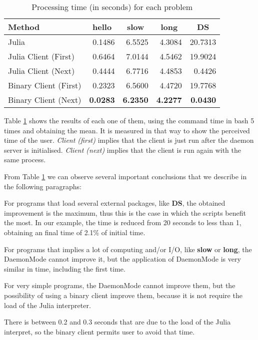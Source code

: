 \documentclass{juliacon}
\begin{document}
\begin{table}[htp]
  \centering
  \begin{tabular}{l*{4}{r}}
    \toprule
    Method & \multicolumn{1}{c}{\textbf{hello}} & \multicolumn{1}{c}{\textbf{slow}} & \multicolumn{1}{c}{\textbf{long}} & \multicolumn{1}{c}{\textbf{DS}}\\
    \midrule
    Julia & 0.1486 & 6.5525 &  4.3084 & 20.7313\\
    Julia Client (First) & 0.6464 & 7.0144 & 4.5462 & 19.9024\\
    Julia Client (Next) & 0.4444 & 6.7716 & 4.4853  & 0.4426\\
    Binary Client (First) & 0.2323 & 6.5600 & 4.4720 & 19.7768\\
    Binary Client (Next) & \textbf{0.0283} & \textbf{6.2350} & \textbf{4.2277} & \textbf{0.0430}\\
    \bottomrule
  \end{tabular}
  \caption{Processing time (in seconds) for each problem}
  \label{tab:times}
\end{table}

Table \ref{tab:times} shows the results of each one of them, using the command
time in bash 5 times and obtaining the mean. It is measured in that way to show
the perceived time of the user. \textit{Client (first)} implies that the client is just
run after the daemon server is initialised. \textit{Client (next)} implies that
the client is run again with the same process.

From Table \ref{tab:times} we can observe several important conclusions that we
describe in the following paragraphs:

For programs that load several external packages, like \textbf{DS}, the obtained
improvement is the maximum, thus this is the case in which the scripts benefit
the most. In our example, the time is reduced from 20 seconds to less than 1,
obtaining an final time of 2.1\% of initial time.
  
For programs that implies a lot of computing and/or I/O, like \textbf{slow} or
\textbf{long}, the DaemonMode cannot improve it, but the application of
DaemonMode is very similar in time, including the first time. 
 
For very simple programs, the DaemonMode cannot improve them, but the
possibility of using a binary client improve them, because it is not require the
load of the Julia interpreter.

There is between 0.2 and 0.3 seconds that are due to the load of the Julia
interpret, so the binary client permits user to avoid that time. 
\end{document}
